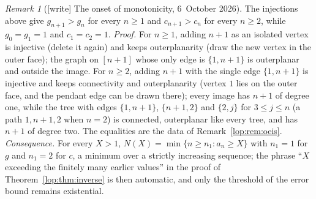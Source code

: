 \documentclass[11pt,letterpaper]{article}
\numberwithin{equation}{section}
\theoremstyle{remark}\newtheorem{remark}[theorem]{Remark}
\begin{document}
\begin{remark}[{[write]} The onset of monotonicity, 6~October 2026]\label{lop:rem:onset}
The injections above give $g_{n+1}>g_n$ for every $n\ge1$ and
$c_{n+1}>c_n$ for every $n\ge2$, while $g_0=g_1=1$ and $c_1=c_2=1$.
\emph{Proof.} For $n\ge1$, adding $n+1$ as an isolated vertex is injective
(delete it again) and keeps outerplanarity (draw the new vertex in the outer
face); the graph on $[n+1]$ whose only edge is $\{1,n+1\}$ is outerplanar and
outside the image. For $n\ge2$, adding $n+1$ with the single edge
$\{1,n+1\}$ is injective and keeps connectivity and outerplanarity (vertex
$1$ lies on the outer face, and the pendant edge can be drawn there); every
image has $n+1$ of degree one, while the tree with edges $\{1,n+1\}$,
$\{n+1,2\}$ and $\{2,j\}$ for $3\le j\le n$ (a path $1,n+1,2$ when $n=2$) is
connected, outerplanar like every tree, and has $n+1$ of degree two. The
equalities are the data of Remark~\ref{lop:rem:oeis}. \emph{Consequence.}
For every $X>1$, $N(X)=\min\{n\ge n_1:a_n\ge X\}$ with $n_1=1$ for $g$ and
$n_1=2$ for $c$, a minimum over a strictly increasing sequence; the phrase
``$X$ exceeding the finitely many earlier values'' in the proof of
Theorem~\ref{lop:thm:inverse} is then automatic, and only the threshold of
the error bound remains existential.
\end{remark}
\end{document}
